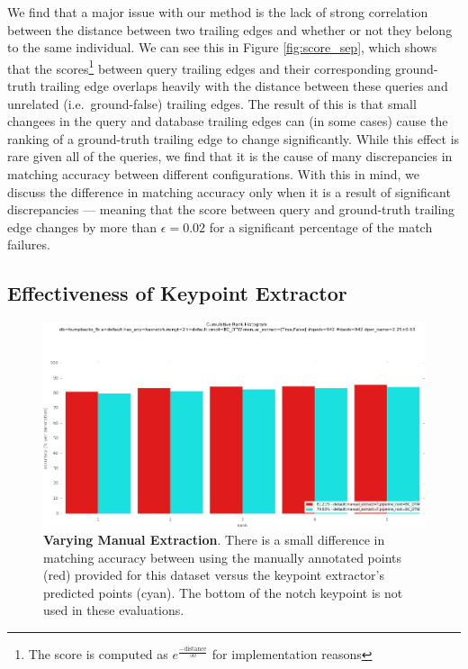We find that a major issue with our method is the lack of strong correlation between the distance between two trailing edges and whether or not they belong to the same individual.
We can see this in Figure \ref{fig:score_sep}, which shows that the scores\footnote{The score is computed as $e^{\frac{-\text{distance}}{50}}$ for implementation reasons} between query trailing edges and their corresponding ground-truth trailing edge overlaps heavily with the distance between these queries and unrelated (i.e.\ ground-false) trailing edges.
The result of this is that small changees in the query and database trailing edges can (in some cases) cause the ranking of a ground-truth trailing edge to change significantly.
While this effect is rare given all of the queries, we find that it is the cause of many discrepancies in matching accuracy between different configurations.
With this in mind, we discuss the difference in matching accuracy only when it is a result of significant discrepancies --- meaning that the score between query and ground-truth trailing edge changes by more than $\epsilon = 0.02$ for a significant percentage of the match failures. %

\subsection{Effectiveness of Keypoint Extractor}
\begin{figure}[t]%
\centering
\includegraphics[width=1\textwidth]{../images/results/vary_manual_extract.png}
\caption{\textbf{Varying Manual Extraction}. There is a small difference in matching accuracy between using the manually annotated points (red) provided for this dataset versus the keypoint extractor's predicted points (cyan). The bottom of the notch keypoint is not used in these evaluations.}
\label{fig:vary_manual_extract}
\end{figure}

